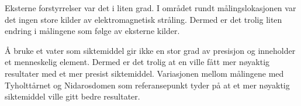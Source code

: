 \begin{itemize}
Eksterne forstyrrelser var det i liten grad. I området rundt målingslokasjonen var det ingen store kilder av elektromagnetisk stråling. Dermed er det trolig liten endring i målingene som følge av eksterne kilder. 

Å bruke et vater som siktemiddel gir ikke en stor grad av presisjon og inneholder et menneskelig element. Dermed er det trolig at en ville fått mer nøyaktig resultater med et mer presist siktemiddel. Variasjonen mellom målingene med Tyholttårnet og Nidarosdomen som referansepunkt tyder på at et mer nøyaktig siktemiddel ville gitt bedre resultater.

\end{itemize}



 